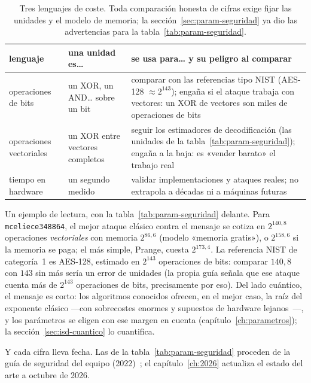 \begin{table}[htbp]
\centering
\footnotesize
\setlength{\tabcolsep}{6pt}
\begin{tabular}{@{}p{3.2cm}p{4.4cm}p{6.8cm}@{}}
\toprule
lenguaje & una unidad es\ldots{} & se usa para\ldots{} y su
peligro al comparar\\
\midrule
operaciones de bits & un XOR, un AND\ldots{} sobre un bit &
comparar con las referencias tipo NIST (AES-128 $\approx2^{143}$);
engaña si el ataque trabaja con vectores: un XOR de vectores son
miles de operaciones de bits\\
operaciones vectoriales & un XOR entre vectores completos & seguir
los estimadores de decodificación (las unidades de la
tabla~\ref{tab:param-seguridad}); engaña a la baja: es «vender
barato» el trabajo real\\
tiempo en hardware & un segundo medido & validar implementaciones y
ataques reales; no extrapola a décadas ni a máquinas futuras\\
\bottomrule
\end{tabular}
\caption{Tres lenguajes de coste. Toda comparación honesta de cifras
exige fijar las unidades y el modelo de memoria; la
sección~\ref{sec:param-seguridad} ya dio las advertencias para la
tabla~\ref{tab:param-seguridad}.}
\label{tab:seg-costes}
\end{table}

Un ejemplo de lectura, con la tabla~\ref{tab:param-seguridad} delante.
Para \texttt{mceliece348864}, el mejor ataque clásico contra el
mensaje se cotiza en $2^{140{,}8}$ operaciones \emph{vectoriales} con
memoria $2^{86{,}6}$ (modelo «memoria gratis»), o $2^{158{,}6}$ si la
memoria se paga; el más simple, Prange, cuesta $2^{173{,}4}$. La
referencia NIST de categoría~1 es AES-128, estimado en $2^{143}$
operaciones de bits: comparar $140{,}8$ con $143$ sin más sería un
error de unidades (la propia guía señala que ese ataque cuenta más de
$2^{143}$ operaciones de bits, precisamente por eso). Del lado
cuántico, el mensaje es corto: los algoritmos conocidos ofrecen, en
el mejor caso, la raíz del exponente clásico ---con sobrecostes
enormes y supuestos de hardware lejanos~\cite{gidney2021}---, y los
parámetros se eligen con ese margen en cuenta
(capítulo~\ref{ch:parametros}); la
sección~\ref{sec:isd-cuantico} lo cuantifica.

Y cada cifra lleva fecha. Las de la
tabla~\ref{tab:param-seguridad} proceden de la guía de seguridad del
equipo (2022)~\cite{cmsecurity}; el capítulo~\ref{ch:2026} actualiza
el estado del arte a octubre de 2026.


